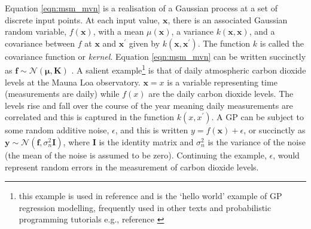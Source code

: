 Equation \ref{eqn:msm_mvn} is a realisation of a Gaussian process at a set of discrete input points. At each  input value, $\mathbf{x}$, there is an associated Gaussian random variable, $f(\mathbf{x})$, with a mean $\mu(\mathbf{x})$, a variance $k(\mathbf{x}, \mathbf{x})$, and a covariance between $f$ at $\mathbf{x}$ and  $\mathbf{x}^{\prime}$ given by $k(\mathbf{x}, \mathbf{x}^{\prime})$. The function $k$ is called the covariance function or \emph{kernel}.  Equation \ref{eqn:msm_mvn} can be written succinctly as $\mathbf{f} \sim \mathcal{N}(\bm{\mu}, \mathbf{K})$ \cite{rasmussenGaussianProcessesMachine2006}. A salient example\footnote{this example is used in reference \cite{rasmussenGaussianProcessesMachine2006} and is the `hello world' example of GP regression modelling, frequently used in other texts and probabilistic programming tutorials e.g., reference \cite{salvatierProbabilisticProgrammingPython2016}} is that of daily atmospheric carbon dioxide levels at the Mauna Loa observatory.  $\mathbf{x} = x$ is a variable representing time (measurements are daily) while $f(x)$ are the daily carbon dioxide levels. The levels rise and fall over the course of the year meaning daily measurements are correlated and this is captured in the function $k(x, x^{\prime})$.  A GP can be subject to some random additive noise, $\epsilon$,  and this is written $y = f(\mathbf{x}) + \epsilon$, or succinctly as $\mathbf{y} \sim \mathcal{N}(\mathbf{f}, \sigma_{n}^{2}\mathbf{I})$, where $\mathbf{I}$ is the identity matrix and $\sigma_{n}^{2}$ is the variance of the noise \cite{rasmussenGaussianProcessesMachine2006} (the mean of the noise is assumed to be zero).  Continuing the example, $\epsilon$, would represent random errors in the measurement of carbon dioxide levels. 

